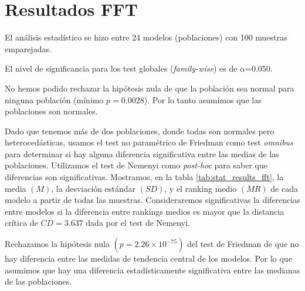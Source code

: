 \documentclass[a4paper,oneside,11pt,leqno]{article}
\begin{document}
	\section{Resultados FFT}
	\label{sec:results_fft}
	
	El análisis estadístico se hizo entre 24 modelos (poblaciones) con 100 muestras emparejadas.
	
	El nivel de significancia para los test globales (\textit{family-wise}) es de $\alpha$=0.050.
	
	No hemos podido rechazar la hipótesis nula de que la población sea normal para ninguna población (mínimo $p=0.0028$). Por lo tanto asumimos que las poblaciones son normales.
	
	Dado que tenemos más de dos poblaciones, donde todas son normales pero heterocedásticas, usamos el test no paramétrico de Friedman como test \textit{omnibus} para determinar si hay alguna diferencia significativa entre las medias de las poblaciones. Utilizamos el test de Nemenyi como \textit{post-hoc} para saber que diferencias son significativas. Mostramos, en la tabla \ref{tab:stat_results_fft}, la media $(M)$, la desviación estándar $(SD)$, y el ranking medio $(MR)$ de cada modelo a partir de todas las muestras. Consideraremos significativas la diferencias entre modelos si la diferencia entre rankings medios es mayor que la distancia crítica de $CD=3.637$ dada por el test de Nemenyi.
	
	Rechazamos la hipótesis nula $(p=2.26\times 10^{-75})$ del test de Friedman de que no hay diferencia entre las medidas de tendencia central de los modelos. Por lo que asumimos que hay una diferencia estadísticamente significativa entre las medianas de las poblaciones.
	
\end{document}
